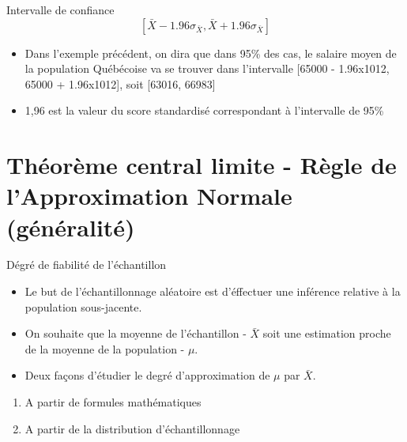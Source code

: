 \documentclass[
  ignorenonframetext,
]{beamer}
\providecommand{\tightlist}{%
  \setlength{\itemsep}{0pt}\setlength{\parskip}{0pt}}
\begin{document}
\begin{frame}{Intervalle de confiance}
\protect\hypertarget{intervalle-de-confiance-3}{}
\[ [\bar{X} - 1.96\sigma_{\bar{X}} , \bar{X} + 1.96\sigma_{\bar{X}}]\]

\begin{itemize}[<+->]
\tightlist
\item
  Dans l'exemple précédent, on dira que dans 95\% des cas, le salaire
  moyen de la population Québécoise va se trouver dans l'intervalle
  {[}65000 - 1.96x1012, 65000 + 1.96x1012{]}, soit {[}63016, 66983{]}
\end{itemize}

\begin{itemize}[<+->]
\tightlist
\item
  1,96 est la valeur du score standardisé correspondant à l'intervalle
  de 95\%
\end{itemize}
\end{frame}

\hypertarget{thuxe9oruxe8me-central-limite---ruxe8gle-de-lapproximation-normale-guxe9nuxe9ralituxe9}{%
\section{Théorème central limite - Règle de l'Approximation Normale
(généralité)}\label{thuxe9oruxe8me-central-limite---ruxe8gle-de-lapproximation-normale-guxe9nuxe9ralituxe9}}

\begin{frame}{Dégré de fiabilité de l'échantillon}
\protect\hypertarget{duxe9gruxe9-de-fiabilituxe9-de-luxe9chantillon}{}
\begin{itemize}
\item
  Le but de l'échantillonnage aléatoire est d'éffectuer une inférence
  relative à la population sous-jacente.
\item
  On souhaite que la moyenne de l'échantillon - \(\bar{X}\) soit une
  estimation proche de la moyenne de la population - \(\mu\).
\item
  Deux façons d'étudier le degré d'approximation de \(\mu\) par
  \(\bar{X}\).
\end{itemize}

\begin{enumerate}
\tightlist
\item
  A partir de formules mathématiques
\item
  A partir de la distribution d'échantillonnage
\end{enumerate}
\end{frame}
\end{document}

